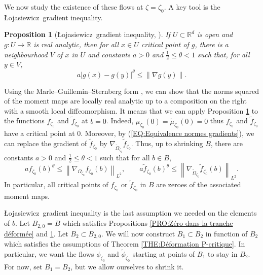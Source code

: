 \documentclass{article}
\newtheorem{proposition}[theorem]{Proposition}
\theoremstyle{remark}
\theoremstyle{definition}
\newcommand{\R}{\mathbb{R}}
\newcommand{\abs}[1]{\left| #1 \right|}
\newcommand{\norme}[1]{\left\| #1 \right\|}
\newcommand{\Lo}{Łojasiewicz}
\renewcommand{\leq}{\leqslant}
\begin{document}
We now study the existence of these flows at $\zeta = \zeta_0$. A key tool is the \Lo\ gradient inequality.

\begin{proposition}[\Lo\ gradient inequality, {\cite[Chapter 18, Proposition 1]{Lojasiewicz}}]\label{PRO:Lojasiewicz}
    If $U \subset \R^d$ is open and $g : U \rightarrow \R$ is real analytic, then for all $x \in U$ critical point of $g$, there is a neighbourhood $V$ of $x$ in $U$ and constants $a > 0$ and $\frac{1}{2} \leq \theta < 1$ such that, for all $y \in V$,
    $$
    a\abs{g(x) - g(y)}^\theta \leq \norme{\nabla g(y)}.
    $$
\end{proposition}

Using the Marle--Guillemin--Sternberg form \cite[Theorem 2.1]{Lerman}, we can show that the norms squared of the moment maps are locally real analytic up to a composition on the right with a smooth local diffeomorphism. It means that we can apply Proposition \ref{PRO:Lojasiewicz} to the functions $f_{\zeta_0}$ and $\tilde{f}_{\zeta_0}$ at $b = 0$. Indeed, $\mu_{\zeta_0}(0) = \tilde{\mu}_{\zeta_0}(0) = 0$ thus $f_{\zeta_0}$ and $\tilde{f}_{\zeta_0}$ have a critical point at $0$. Moreover, by (\ref{EQ:Equivalence normes gradients}), we can replace the gradient of $\tilde{f}_{\zeta_0}$ by $\nabla_{\tilde{\Omega}_{\zeta_0}}\tilde{f}_{\zeta_0}$. Thus, up to shrinking $B$, there are constants $a > 0$ and $\frac{1}{2} \leq \theta < 1$ such that for all $b \in B$,
\begin{equation}\label{EQ:Lojasiewicz}
    af_{\zeta_0}(b)^\theta \leq \norme{\nabla_{\Omega_{\zeta_0}}f_{\zeta_0}(b)}_{L^2}, \qquad a\tilde{f}_{\zeta_0}(b)^\theta \leq \norme{\nabla_{\tilde{\Omega}_{\zeta_0}}\tilde{f}_{\zeta_0}(b)}_{L^2}.
\end{equation}
In particular, all critical points of $f_{\zeta_0}$ or $\tilde{f}_{\zeta_0}$ in $B$ are zeroes of the associated moment maps.

\Lo\ gradient inequality is the last assumption we needed on the elements of $b$. Let $B_{2,0} = B$ which satisfies Propositions \ref{PRO:Zéro dans la tranche déformée} and \ref{PRO:Lojasiewicz}. Let $B_2 \subset B_{2,0}$. We will now construct $B_1 \subset B_2$ in function of $B_2$ which satisfies the assumptions of Theorem \ref{THE:Déformation P-critique}. In particular, we want the flows $\phi_{\zeta_0}$ and $\tilde{\phi}_{\zeta_0}$ starting at points of $B_1$ to stay in $B_2$. For now, set $B_1 = B_2$, but we allow ourselves to shrink it.
\end{document}
